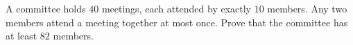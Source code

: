 A committee holds $40$ meetings, each attended by exactly $10$ members. Any two members attend a meeting together at most once. Prove that the committee has at least $82$ members.
